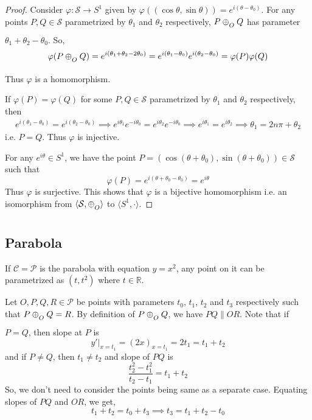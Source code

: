 \begin{proof}
    Consider $\varphi:\mathcal{S} \to S^1$ given by
    $\varphi((\cos\theta,\sin\theta)) = e^{i(\theta-\theta_0)}$. For any points
    $P,Q\in\mathcal{S}$ parametrized by $\theta_1$ and $\theta_2$ respectively,
    $P \conop Q$ has parameter $\theta_1 + \theta_2 - \theta_0$. So,
    \[
        \varphi(P \conop Q) = e^{i(\theta_1 + \theta_2 - 2\theta_0)}
        = e^{i(\theta_1 - \theta_0)}e^{i(\theta_2 - \theta_0)} = \varphi(P)\varphi(Q)
    \]
    Thus $\varphi$ is a homomorphism.
    \vspace{1ex}

    \noindent
    If $\varphi(P)=\varphi(Q)$ for some $P,Q\in\mathcal{S}$ parametrized by
    $\theta_1$ and $\theta_2$ respectively, then
    \begin{align*}
        e^{i(\theta_1-\theta_0)} = e^{i(\theta_2-\theta_0)}
        \implies e^{i\theta_1}e^{-i\theta_0} = e^{i\theta_2}e^{-i\theta_0}
        \implies e^{i\theta_1} = e^{i\theta_2}
        \implies \theta_1 = 2n\pi + \theta_2
    \end{align*}
    i.e. $P=Q$. Thus $\varphi$ is injective.
    \vspace{1ex}

    \noindent
    For any $e^{i\theta} \in S^1$, we have the point
    $P=(\cos(\theta+\theta_0),\sin(\theta+\theta_0)) \in \mathcal{S}$ such that
    \[ \varphi(P) = e^{i(\theta + \theta_0 - \theta_0)} = e^{i\theta} \]
    Thus $\varphi$ is surjective. This shows that $\varphi$ is a bijective
    homomorphism i.e. an isomorphism from $\langle \mathcal{S},\conop \rangle$ to
    $\langle S^1,\cdot \rangle$.
\end{proof}

\subsection*{Parabola}

If $\mathcal{C}=\mathcal{P}$ is the parabola with equation $y=x^2$, any point on
it can be parametrized as $(t,t^2)$ where $t\in\mathbb{R}$.
\vspace{1ex}

Let $O,P,Q,R\in\mathcal{P}$ be points with parameters $t_0$, $t_1$, $t_2$ and
$t_3$ respectively such that $P \conop Q = R$. By definition of $P \conop Q$, we
have $PQ \parallel OR$. Note that if $P=Q$, then slope at $P$ is
\[
    y'|_{x=t_1} = \left(2x\right)_{x=t_1} = 2t_1 = t_1 + t_2
\]
and if $P \neq Q$, then $t_1 \neq t_2$ and slope of $PQ$ is 
\[
    \frac{t_2^2-t_1^2}{t_2-t_1} = t_1 + t_2
\]
So, we don't need to consider the points being same as a separate case. Equating
slopes of $PQ$ and $OR$, we get,
\[ t_1 + t_2 = t_0 + t_3 \implies t_3 = t_1 + t_2 - t_0 \]

